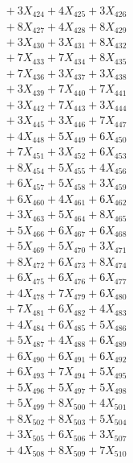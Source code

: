 \documentclass[a4paper,10pt]{article}
\begin{document}
{\begin{align}
&\;  + 3 X_{424} + 4 X_{425} + 3 X_{426} \\[0.3ex]
&\;  + 8 X_{427} + 4 X_{428} + 8 X_{429} \\[0.5ex]\allowbreak
&\;  + 3 X_{430} + 3 X_{431} + 8 X_{432} \\[0.3ex]
&\;  + 7 X_{433} + 7 X_{434} + 8 X_{435} \\[0.3ex]
&\;  + 7 X_{436} + 3 X_{437} + 3 X_{438} \\[0.3ex]
&\;  + 3 X_{439} + 7 X_{440} + 7 X_{441} \\[0.3ex]
&\;  + 3 X_{442} + 7 X_{443} + 3 X_{444} \\[0.3ex]
&\;  + 3 X_{445} + 3 X_{446} + 7 X_{447} \\[0.3ex]
&\;  + 4 X_{448} + 5 X_{449} + 6 X_{450} \\[0.3ex]
&\;  + 7 X_{451} + 3 X_{452} + 6 X_{453} \\[0.3ex]
&\;  + 8 X_{454} + 5 X_{455} + 4 X_{456} \\[0.3ex]
&\;  + 6 X_{457} + 5 X_{458} + 3 X_{459} \\[0.5ex]\allowbreak
&\;  + 6 X_{460} + 4 X_{461} + 6 X_{462} \\[0.3ex]
&\;  + 3 X_{463} + 5 X_{464} + 8 X_{465} \\[0.3ex]
&\;  + 5 X_{466} + 6 X_{467} + 6 X_{468} \\[0.3ex]
&\;  + 5 X_{469} + 5 X_{470} + 3 X_{471} \\[0.3ex]
&\;  + 8 X_{472} + 6 X_{473} + 8 X_{474} \\[0.3ex]
&\;  + 6 X_{475} + 6 X_{476} + 6 X_{477} \\[0.3ex]
&\;  + 4 X_{478} + 7 X_{479} + 6 X_{480} \\[0.3ex]
&\;  + 7 X_{481} + 6 X_{482} + 4 X_{483} \\[0.3ex]
&\;  + 4 X_{484} + 6 X_{485} + 5 X_{486} \\[0.3ex]
&\;  + 5 X_{487} + 4 X_{488} + 6 X_{489} \\[0.5ex]\allowbreak
&\;  + 6 X_{490} + 6 X_{491} + 6 X_{492} \\[0.3ex]
&\;  + 6 X_{493} + 7 X_{494} + 5 X_{495} \\[0.3ex]
&\;  + 5 X_{496} + 5 X_{497} + 5 X_{498} \\[0.3ex]
&\;  + 5 X_{499} + 8 X_{500} + 4 X_{501} \\[0.3ex]
&\;  + 8 X_{502} + 8 X_{503} + 5 X_{504} \\[0.3ex]
&\;  + 3 X_{505} + 6 X_{506} + 3 X_{507} \\[0.3ex]
&\;  + 4 X_{508} + 8 X_{509} + 7 X_{510} \\[0.3ex]

\end{align}}
\end{document}
